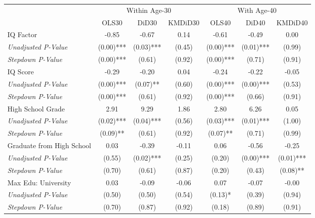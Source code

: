\begin{tabular}{l c c c c c c}
\toprule
& \multicolumn{3}{c}{Within Age-30} & \multicolumn{3}{c}{With Age-40} \\\cmidrule(lr){2-4} \cmidrule(lr){5-7}
 & OLS30 & DiD30 & KMDiD30 & OLS40 & DiD40 & KMDiD40 \\
\midrule
IQ Factor & -0.85 & -0.67 & 0.14 & -0.61 & -0.49 & 0.00 \\
\quad \textit{Unadjusted P-Value} & (0.00)*** & (0.03)*** & (0.45) & (0.00)*** & (0.01)*** & (0.99) \\
\quad \textit{Stepdown P-Value} & (0.00)*** & (0.61) & (0.92) & (0.00)*** & (0.71) & (0.91) \\
IQ Score & -0.29 & -0.20 & 0.04 & -0.24 & -0.22 & -0.05 \\
\quad \textit{Unadjusted P-Value} & (0.00)*** & (0.07)** & (0.60) & (0.00)*** & (0.00)*** & (0.53) \\
\quad \textit{Stepdown P-Value} & (0.00)*** & (0.61) & (0.92) & (0.00)*** & (0.66) & (0.91) \\
High School Grade & 2.91 & 9.29 & 1.86 & 2.80 & 6.26 & 0.05 \\
\quad \textit{Unadjusted P-Value} & (0.02)*** & (0.04)*** & (0.56) & (0.03)*** & (0.01)*** & (1.00) \\
\quad \textit{Stepdown P-Value} & (0.09)** & (0.61) & (0.92) & (0.07)** & (0.71) & (0.99) \\
Graduate from High School & 0.03 & -0.39 & -0.11 & 0.06 & -0.56 & -0.25 \\
\quad \textit{Unadjusted P-Value} & (0.55) & (0.02)*** & (0.25) & (0.20) & (0.00)*** & (0.01)*** \\
\quad \textit{Stepdown P-Value} & (0.70) & (0.61) & (0.87) & (0.20) & (0.43) & (0.08)** \\
Max Edu: University & 0.03 & -0.09 & -0.06 & 0.07 & -0.07 & -0.00 \\
\quad \textit{Unadjusted P-Value} & (0.50) & (0.50) & (0.54) & (0.13)* & (0.39) & (0.94) \\
\quad \textit{Stepdown P-Value} & (0.70) & (0.87) & (0.92) & (0.18) & (0.89) & (0.91) \\
\bottomrule
\end{tabular}
